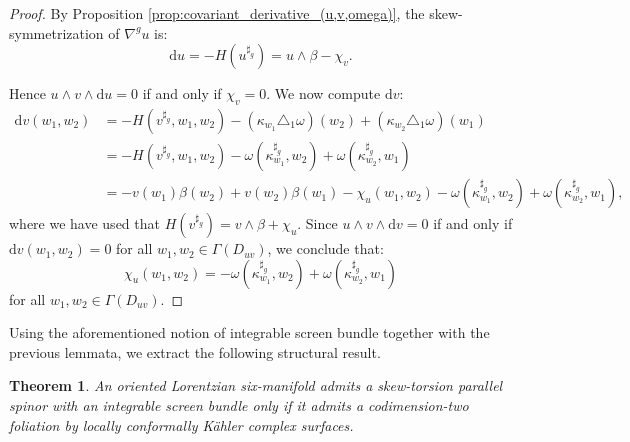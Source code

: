 \documentclass[10pt,a4paper,twoside,reqno]{amsart}
\theoremstyle{plain}
\newtheorem{thm}{Theorem}[section]
\theoremstyle{definition}
\theoremstyle{remark}
\def\dd{\mathrm{d}}
\def\dd{\mathrm{d}}
\begin{document}
\begin{proof}
    By Proposition \ref{prop:covariant_derivative_(u,v,omega)}, the skew-symmetrization of $\nabla^gu$ is: $$\dd u=-H(u^{\sharp_g})=u\wedge\beta-\chi_v.$$

    Hence $u\wedge v\wedge\dd u=0$ if and only if $\chi_v=0$. We now compute $\dd v$: \begin{align*}
        \dd v(w_1,w_2)&=-H(v^{\sharp_g},w_1,w_2)-(\kappa_{w_1}\triangle_1\omega)(w_2)+(\kappa_{w_2}\triangle_1\omega)(w_1)\\
        &=-H(v^{\sharp_g},w_1,w_2)-\omega(\kappa_{w_1}^{\sharp_g},w_2)+\omega(\kappa_{w_2}^{\sharp_g},w_1)\\
        &=-v(w_1)\beta(w_2)+v(w_2)\beta(w_1)-\chi_u(w_1,w_2)-\omega(\kappa_{w_1}^{\sharp_g},w_2)+\omega(\kappa_{w_2}^{\sharp_g},w_1),
    \end{align*} where we have used that $H(v^{\sharp_g})=v\wedge\beta+\chi_u$. Since $u\wedge v\wedge\dd v=0$ if and only if $\dd v(w_1,w_2)=0$ for all $w_1,w_2\in\Gamma(D_{uv})$, we conclude that: $$\chi_u(w_1,w_2)=-\omega(\kappa_{w_1}^{\sharp_g},w_2)+\omega(\kappa_{w_2}^{\sharp_g},w_1)$$ for all $w_1,w_2\in\Gamma(D_{uv})$.
\end{proof}

Using the aforementioned notion of integrable screen bundle together with the previous lemmata, we extract the following structural result.

\begin{thm}
\label{thm:transverse_LCK}
An oriented Lorentzian six-manifold admits a skew-torsion parallel spinor with an integrable screen bundle only if it admits a codimension-two foliation by locally conformally Kähler complex surfaces.
\end{thm}
\end{document}
